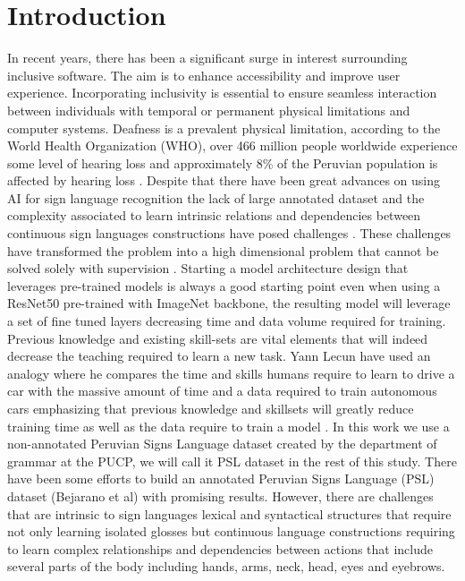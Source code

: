 \documentclass[twocolumn,conference]{article}
\begin{document}
\section{Introduction}\label{Introduction}
In recent years, there has been a significant surge in interest surrounding inclusive software. The aim is to enhance accessibility and improve user experience. Incorporating inclusivity is essential to ensure seamless interaction between individuals with temporal or permanent physical limitations and computer systems. Deafness is a prevalent physical limitation, according to the World Health Organization (WHO), over 466 million people worldwide experience some level of hearing loss \cite{deafness_and_hearing_loss_2020} and approximately 8\% of the Peruvian population is affected by hearing loss \cite{disabilities_survey_2012}. Despite that there have been great advances on using AI for sign language recognition the lack of large annotated dataset and the complexity associated to learn intrinsic relations and dependencies between continuous sign languages constructions have posed challenges \cite{adaloglou2020comprehensive}. These challenges  have transformed the problem into a high dimensional problem that cannot be solved solely with supervision \cite{facebook-ssl}. Starting a model architecture design that leverages pre-trained models is always a good starting point even when using a ResNet50 pre-trained with ImageNet backbone, the resulting model will leverage a set of fine tuned layers decreasing time and data volume required for training. Previous knowledge and existing skill-sets are vital elements that will indeed decrease the teaching required to learn a new task. Yann Lecun have used an analogy where he compares the time and skills humans require to learn to drive a car with the massive amount of time and a data required to train autonomous cars emphasizing that previous knowledge and skillsets will greatly reduce training time as well as the data require to train a model \cite{facebook-ssl}.
In this work we use a non-annotated Peruvian Signs Language dataset created by the department of grammar at the PUCP, we will call it PSL dataset in the rest of this study. There have been some efforts to build an annotated Peruvian Signs Language (PSL) dataset (Bejarano et al) with promising results. However, there are challenges that are intrinsic to sign languages lexical and syntactical structures that require not only learning isolated glosses but continuous language constructions requiring to learn complex relationships and dependencies between actions that include several parts of the body including hands, arms, neck, head, eyes and eyebrows. 
\end{document}
